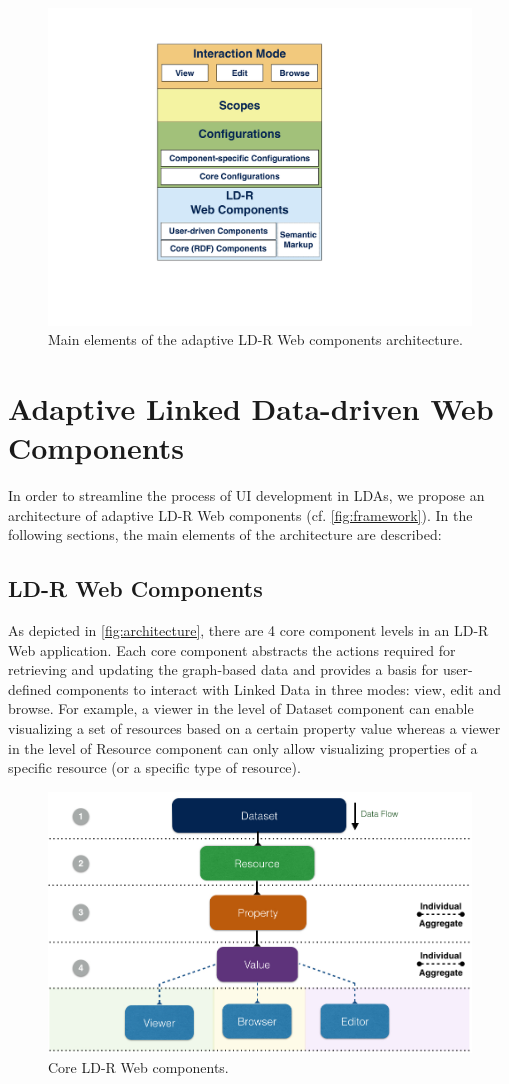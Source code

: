 \documentclass{acm_proc_article-sp}
\begin{document}
\begin{figure}[htb]
	\center
  \includegraphics[width=0.60\linewidth]{images/framework.pdf}
  \caption{Main elements of the adaptive LD-R Web components architecture.}
  \label{fig:framework}
\end{figure}

\section{Adaptive Linked Data-driven Web Components}
In order to streamline the process of UI development in LDAs, we propose an architecture of adaptive LD-R Web components (cf. \autoref{fig:framework}).
In the following sections, the main elements of the architecture are described:

\subsection{LD-R Web Components}
As depicted in \autoref{fig:architecture}, there are 4 core component levels in an LD-R Web application.
Each core component abstracts the actions required for retrieving and updating the graph-based data and provides a basis for user-defined components to interact with Linked Data in three modes: view, edit and browse.
For example, a viewer in the level of Dataset component can enable visualizing a set of resources based on a certain property value whereas a viewer in the level of Resource component can only allow visualizing properties of a specific resource (or a specific type of resource).

\begin{figure}[htb]
  \includegraphics[width=1\linewidth]{images/architecture.jpg}
  \caption{Core LD-R Web components.}
  \label{fig:architecture}
\end{figure}
\end{document}
